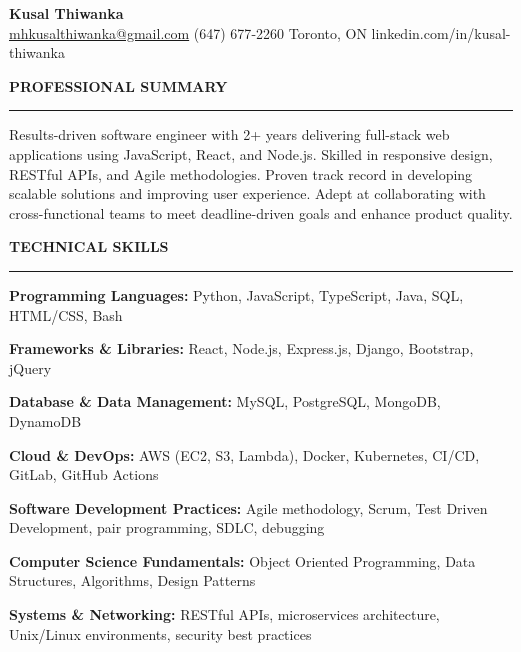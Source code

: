 \documentclass[10pt,letterpaper]{article}
\begin{document}
\begin{center}
{\LARGE\textbf{Kusal Thiwanka}}\\[1pt]
\href{mailto:mhkusalthiwanka@gmail.com}{mhkusalthiwanka@gmail.com}\hspace{2em}%
(647) 677{-}2260\hspace{2em}%
Toronto, ON\hspace{2em}
linkedin.com/in/kusal-thiwanka
\end{center}

\vspace{6pt}

\textbf{PROFESSIONAL SUMMARY}\\[-8pt]
\noindent\rule{\textwidth}{1pt}

\vspace{-2pt}

Results-driven software engineer with 2+ years delivering full-stack web applications using JavaScript, React, and Node.js. Skilled in responsive design, RESTful APIs, and Agile methodologies. Proven track record in developing scalable solutions and improving user experience. Adept at collaborating with cross-functional teams to meet deadline-driven goals and enhance product quality.

\vspace{3pt}

\textbf{TECHNICAL SKILLS}\\[-8pt]
\noindent\rule{\textwidth}{1pt}

\vspace{-2pt}

\textbf{Programming Languages:} Python, JavaScript, TypeScript, Java, SQL, HTML/CSS, Bash

\textbf{Frameworks \& Libraries:} React, Node.js, Express.js, Django, Bootstrap, jQuery

\textbf{Database \& Data Management:} MySQL, PostgreSQL, MongoDB, DynamoDB

\textbf{Cloud \& DevOps:} AWS (EC2, S3, Lambda), Docker, Kubernetes, CI/CD, GitLab, GitHub Actions

\textbf{Software Development Practices:} Agile methodology, Scrum, Test Driven Development, pair programming, SDLC, debugging

\textbf{Computer Science Fundamentals:} Object Oriented Programming, Data Structures, Algorithms, Design Patterns

\textbf{Systems \& Networking:} RESTful APIs, microservices architecture, Unix/Linux environments, security best practices
\end{document}
